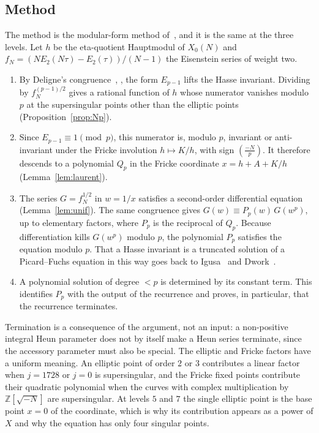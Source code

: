 \documentclass[11pt,a4paper]{article}
\theoremstyle{definition}
\theoremstyle{remark}
\newcommand{\Z}{\mathbb{Z}}
\newcommand{\leg}[2]{\left(\frac{#1}{#2}\right)}
\numberwithin{equation}{section}
\begin{document}
\subsection*{Method}
The method is the modular-form method of~\cite{KZ}, and it is the same at the
three levels. Let $h$ be the eta-quotient Hauptmodul of $X_0(N)$ and
$f_N=(NE_2(N\tau)-E_2(\tau))/(N-1)$ the Eisenstein series of weight two.
\begin{enumerate}
\item By Deligne's congruence~\cite{Serre}, \cite[Theorem~1]{KZ}, the form $E_{p-1}$ lifts
the Hasse invariant. Dividing by $f_N^{(p-1)/2}$ gives a rational function of
$h$ whose numerator vanishes modulo $p$ at the supersingular points other
than the elliptic points
(Proposition~\ref{prop:Np}).
\item Since $E_{p-1}\equiv1\pmod p$, this numerator is, modulo $p$, invariant
or anti-invariant under the Fricke involution $h\mapsto K/h$, with sign
$\leg{-N}{p}$. It therefore descends to a polynomial $Q_p$ in the Fricke
coordinate $x=h+A+K/h$ (Lemma~\ref{lem:laurent}).
\item The series $G=f_N^{1/2}$ in $w=1/x$ satisfies a second-order
differential equation (Lemma~\ref{lem:unif}). The same congruence gives
$G(w)\equiv P_p(w)\,G(w^p)$, up to elementary factors, where $P_p$ is the
reciprocal of $Q_p$. Because differentiation kills $G(w^p)$ modulo $p$, the
polynomial $P_p$ satisfies the equation modulo $p$. That a Hasse invariant is
a truncated solution of a Picard--Fuchs equation in this way goes back to
Igusa~\cite{Igusa} and Dwork~\cite{Dwork}.
\item A polynomial solution of degree $<p$ is determined by its constant
term. This identifies $P_p$ with the output of the recurrence and proves, in
particular, that the recurrence terminates.
\end{enumerate}
Termination is a consequence of the argument, not an input: a non-positive
integral Heun parameter does not by itself make a Heun series terminate, since
the accessory parameter must also be special. The elliptic and Fricke factors
have a uniform meaning. An elliptic point of order $2$ or $3$ contributes a
linear factor when $j=1728$ or $j=0$ is supersingular, and the Fricke fixed
points contribute their quadratic polynomial when the curves with complex
multiplication by $\Z[\sqrt{-N}]$ are supersingular. At levels $5$ and $7$ the
single elliptic point is the base point $x=0$ of the coordinate, which is why
its contribution appears as a power of $X$ and why the equation has only four
singular points.
\end{document}
